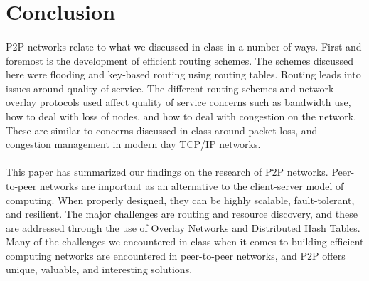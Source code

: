 \documentclass[12pt,letterpaper]{article}
\begin{document}
\section{Conclusion}

\paragraph{}
P2P networks relate to what we discussed in class in a number of ways.
First and foremost is the development of efficient routing schemes.
The schemes discussed here were flooding and key-based routing using routing tables.
Routing leads into issues around quality of service.
The different routing schemes and network overlay protocols used affect quality of service concerns such as bandwidth use, how to deal with loss of nodes, and how to deal with congestion on the network.
These are similar to concerns discussed in class around packet loss, and congestion management in modern day TCP/IP networks.

\paragraph{}
This paper has summarized our findings on the research of P2P networks.
Peer-to-peer networks are important as an alternative to the client-server model of computing.
When properly designed, they can be highly scalable, fault-tolerant, and resilient.
The major challenges are routing and resource discovery, and these are addressed through the use of Overlay Networks and Distributed Hash Tables.
Many of the challenges we encountered in class when it comes to building efficient computing networks are encountered in peer-to-peer networks, and P2P offers unique, valuable, and interesting solutions.



\end{document}
